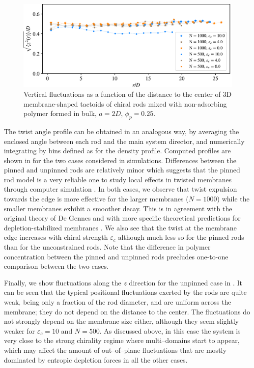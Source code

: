 \begin{figure}
\begin{center}
\includegraphics[width= .8\columnwidth]{figures/chapter-5/zstd}
	\caption[Vertical fluctuations]{Vertical fluctuations as a function of the distance to the center of 3D membrane-shaped tactoids of chiral rods mixed with non-adsorbing polymer formed in bulk, $a = 2D$, $\phi_p=0.25$. } %
 \label{zstd}
\end{center}
\end{figure}

The twist angle profile can be obtained in an analogous way, by averaging the enclosed angle between each rod and the main system director, and numerically integrating by bins defined as for the density profile. Computed profiles are shown in  for the two cases considered in simulations. Differences between the pinned and unpinned rods are relatively minor which suggests that the pinned rod model is a very reliable one to study local effects in twisted membranes through computer simulation \cite{kuhnhold2022colloidal}. In both cases, we observe that twist expulsion towards the edge is more effective for the larger membranes ($N=1000$) while the smaller membranes exhibit a smoother decay. This is in agreement with the original theory of De Gennes \cite{gennes-prost} and with more specific theoretical predictions for depletion-stabilized membranes \cite{wensink2018elastic,kang_sm2016}. We also see that the twist at the membrane edge increases with chiral strength $\varepsilon_{c}$ although much less so for the pinned rods than for the unconstrained rods. Note that the difference in polymer concentration between the pinned and unpinned rods precludes one-to-one comparison between the two cases. 



Finally, we show fluctuations along the $z$ direction for the unpinned case in . It can be seen that the typical positional fluctuations exerted by the rods are quite weak, being only a fraction of the rod diameter,  and are uniform across the membrane; they do not depend on the distance to the center. The fluctuations do not strongly depend on the membrane size either, although they seem slightly weaker for $\varepsilon_c=10$ and $N=500$. As discussed above, in this case the system is very close to the strong chirality regime where multi--domains start to appear, which may affect the amount of out--of--plane fluctuations that are mostly dominated by entropic depletion forces in all the other cases.





